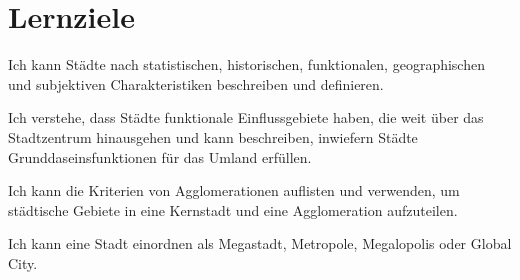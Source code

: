 \clearpage
\section{Lernziele}
\begin{todolist}
    \item Ich kann Städte nach statistischen, historischen, funktionalen, geographischen und subjektiven Charakteristiken beschreiben und definieren.
    \item Ich verstehe, dass Städte funktionale Einflussgebiete haben, die weit über das Stadtzentrum hinausgehen und kann beschreiben, inwiefern Städte Grunddaseinsfunktionen für das Umland erfüllen.
    \item Ich kann die Kriterien von Agglomerationen auflisten und verwenden, um städtische Gebiete in eine Kernstadt und eine Agglomeration aufzuteilen.
    \item Ich kann eine Stadt einordnen als Megastadt, Metropole, Megalopolis oder Global City.
\end{todolist}